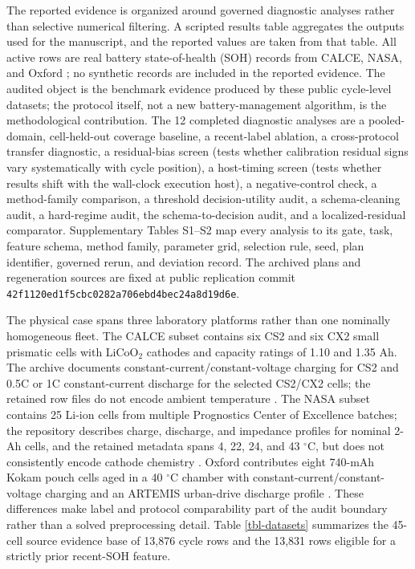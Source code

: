 \documentclass[
  number,
  preprint]{elsarticle}
\begin{document}
The reported evidence is organized around governed diagnostic analyses
rather than selective numerical filtering. A scripted results table
aggregates the outputs used for the manuscript, and the reported values
are taken from that table. All active rows are real battery
state-of-health (SOH) records from CALCE, NASA, and Oxford
\citep{calce_battery_data, nasa_pcoe_battery_data, howey2017oxford}; no
synthetic records are included in the reported evidence. The audited
object is the benchmark evidence produced by these public cycle-level
datasets; the protocol itself, not a new battery-management algorithm,
is the methodological contribution. The 12 completed diagnostic analyses
are a pooled-domain, cell-held-out coverage baseline, a recent-label
ablation, a cross-protocol transfer diagnostic, a residual-bias screen
(tests whether calibration residual signs vary systematically with cycle
position), a host-timing screen (tests whether results shift with the
wall-clock execution host), a negative-control check, a method-family
comparison, a threshold decision-utility audit, a schema-cleaning audit,
a hard-regime audit, the schema-to-decision audit, and a
localized-residual comparator. Supplementary Tables S1--S2 map every
analysis to its gate, task, feature schema, method family, parameter
grid, selection rule, seed, plan identifier, governed rerun, and
deviation record. The archived plans and regeneration sources are fixed
at public replication commit
\texttt{42f1120ed1f5cbc0282a706ebd4bec24a8d19d6e}.

The physical case spans three laboratory platforms rather than one
nominally homogeneous fleet. The CALCE subset contains six CS2 and six
CX2 small prismatic cells with LiCoO\(_2\) cathodes and capacity ratings
of 1.10 and 1.35 Ah. The archive documents
constant-current/constant-voltage charging for CS2 and 0.5C or 1C
constant-current discharge for the selected CS2/CX2 cells; the retained
row files do not encode ambient temperature \citep{calce_battery_data}.
The NASA subset contains 25 Li-ion cells from multiple Prognostics
Center of Excellence batches; the repository describes charge,
discharge, and impedance profiles for nominal 2-Ah cells, and the
retained metadata spans 4, 22, 24, and 43 \(^\circ\)C, but does not
consistently encode cathode chemistry \citep{nasa_pcoe_battery_data}.
Oxford contributes eight 740-mAh Kokam pouch cells aged in a 40
\(^\circ\)C chamber with constant-current/constant-voltage charging and
an ARTEMIS urban-drive discharge profile \citep{howey2017oxford}. These
differences make label and protocol comparability part of the audit
boundary rather than a solved preprocessing detail. Table
\ref{tbl-datasets} summarizes the 45-cell source evidence base of 13,876
cycle rows and the 13,831 rows eligible for a strictly prior recent-SOH
feature.
\end{document}
